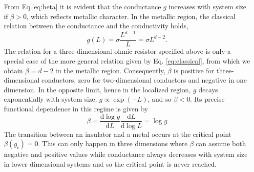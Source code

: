 \documentclass[10pt,a4paper]{article}
\begin{document}
From Eq.\eqref{eq:beta} it is evident that the conductance $g$ increases with system size if $\beta>0$, which reflects metallic character. In the metallic region, the classical relation between the conductance and the conductivity holds,
\begin{equation}\label{eq:classical}
g(L)=\sigma \frac{L^{d-1}}{L}=\sigma L^{d-2}. 
\end{equation}
The relation for a three-dimensional ohmic resistor specified above is only a special case of the more general relation given by Eq. \eqref{eq:classical}, from which we obtain $\beta=d-2$ in the metallic region. Consequently, $\beta$ is positive for three-dimensional conductors, zero for two-dimensional conductors and negative in one dimension. In the opposite limit, hence in the localized region, $g$ decays exponentially with system size, $g \propto \exp(-L)$, and so $\beta<0$. Its precise functional dependence in this regime is given by
$$
\beta=\frac{\mathrm{d}\log g}{\mathrm{d}L}\frac{\mathrm{d}L}{\mathrm{d}\log L}=\log g
$$
The transition between an insulator and a metal occurs at the critical point $\beta(g_c)=0$.  This can only happen in three dimensions where $\beta$ can assume both negative  
and positive values while conductance always decreases with system size in lower dimensional systems and so the critical point is never reached.
\end{document}
